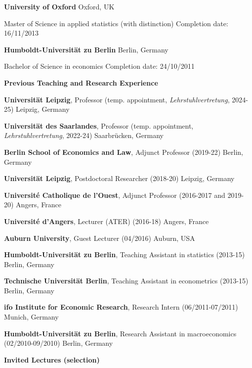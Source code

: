 \documentclass[11pt]{article}
\begin{document}
\vspace{6pt}

\textbf{University of Oxford} \hfill Oxford, UK 

Master of Science in applied statistics (with distinction) \hfill Completion date: 16/11/2013 

\vspace{6pt}

\textbf{Humboldt-Universität zu Berlin} \hfill Berlin, Germany

Bachelor of Science in economics \hfill Completion date: 24/10/2011


\newpage

\begin{center}
    \textbf{Previous Teaching and Research Experience}
\end{center}

\textbf{Universität Leipzig}, Professor (temp. appointment, \textit{Lehrstuhlvertretung}, 2024-25) \hfill Leipzig, Germany

\textbf{Universität des Saarlandes}, Professor (temp. appointment, \textit{Lehrstuhlvertretung}, 2022-24) \hfill Saarbrücken, Germany

\textbf{Berlin School of Economics and Law}, Adjunct Professor (2019-22) \hfill Berlin, Germany

\textbf{Universität Leipzig}, Postdoctoral Researcher (2018-20) \hfill Leipzig, Germany

\textbf{Université Catholique de l'Ouest}, Adjunct Professor (2016-2017 and 2019-20) \hfill Angers, France

\textbf{Université d'Angers}, Lecturer (ATER) (2016-18) \hfill Angers, France

\textbf{Auburn University}, Guest Lecturer (04/2016) \hfill Auburn, USA

\textbf{Humboldt-Universität zu Berlin}, Teaching Assistant in statistics (2013-15) \hfill Berlin, Germany

\textbf{Technische Universität Berlin}, Teaching Assistant in econometrics (2013-15) \hfill Berlin, Germany

\textbf{ifo Institute for Economic Research}, Research Intern (06/2011-07/2011) \hfill Munich, Germany

\textbf{Humboldt-Universität zu Berlin}, Research Assistant in macroeconomics (02/2010-09/2010) \hfill Berlin, Germany

\vspace{25pt}

\begin{center}
    \textbf{Invited Lectures (selection)} \\
\end{center}
\end{document}

